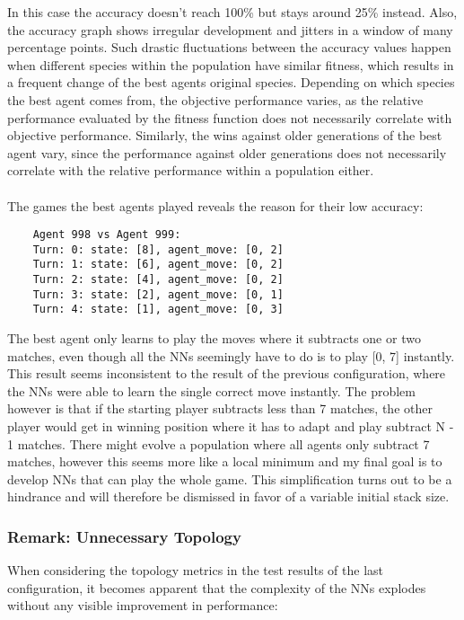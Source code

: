     In this case the accuracy doesn't reach 100\% but stays around 25\% instead.
    Also, the accuracy graph shows irregular development and jitters in a window of many percentage points.
    Such drastic fluctuations between the accuracy values happen when different species within the population have similar fitness, which results in a frequent change of the best agents original species.
    Depending on which species the best agent comes from, the objective performance varies, as the relative performance evaluated by the fitness function does not necessarily correlate with objective performance.
    Similarly, the wins against older generations of the best agent vary, since the performance against older generations does not necessarily correlate with the relative performance within a population either.
    \\ \\
    The games the best agents played reveals the reason for their low accuracy:
    \begin{verbatim}
    Agent 998 vs Agent 999:
    Turn: 0: state: [8], agent_move: [0, 2]
    Turn: 1: state: [6], agent_move: [0, 2]
    Turn: 2: state: [4], agent_move: [0, 2]
    Turn: 3: state: [2], agent_move: [0, 1]
    Turn: 4: state: [1], agent_move: [0, 3]
    \end{verbatim}
    The best agent only learns to play the moves where it subtracts one or two matches, even though all the NNs seemingly have to do is to play [0, 7] instantly.
    This result seems inconsistent to the result of the previous configuration, where the NNs were able to learn the single correct move instantly.
    The problem however is that if the starting player subtracts less than 7 matches, the other player would get in winning position where it has to adapt and play subtract N - 1 matches.
    There might evolve a population where all agents only subtract 7 matches, however this seems more like a local minimum and my final goal is to develop NNs that can play the whole game.
    This simplification turns out to be a hindrance and will therefore be dismissed in favor of a variable initial stack size.

    \subsubsection{Remark: Unnecessary Topology}
    When considering the topology metrics in the test results of the last configuration, it becomes apparent that the complexity of the NNs explodes without any visible improvement in performance:
    \renewcommand{\csvpath}{../data/simple_nim/stack_8/t_1/stats.csv} %



